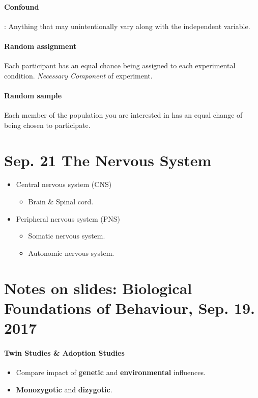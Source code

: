 \documentclass{article}
\begin{document}
	\paragraph{Confound}: Anything that may unintentionally vary along with the independent variable.
	\paragraph{Random assignment} Each participant has an equal chance being assigned to each experimental condition.
	\newline \emph{Necessary Component} of experiment.
	\paragraph{Random sample} Each member of the population you are interested in has an equal change of being chosen to participate.
	\section{Sep. 21 The Nervous System}
	\begin{itemize}
		\item Central nervous system (CNS)
		\begin{itemize}
			\item Brain \& Spinal cord.
		\end{itemize}
		\item Peripheral nervous system (PNS)
		\begin{itemize}
			\item Somatic nervous system.
			\item Autonomic nervous system.
		\end{itemize}
	\end{itemize}
	\section{Notes on slides: Biological Foundations of Behaviour, Sep. 19. 2017}
	\paragraph{Twin Studies \& Adoption Studies}
	\begin{itemize}
		\item Compare impact of \textbf{genetic} and \textbf{environmental} influences.
		\item \textbf{Monozygotic} and \textbf{dizygotic}.
	\end{itemize}
\end{document}
